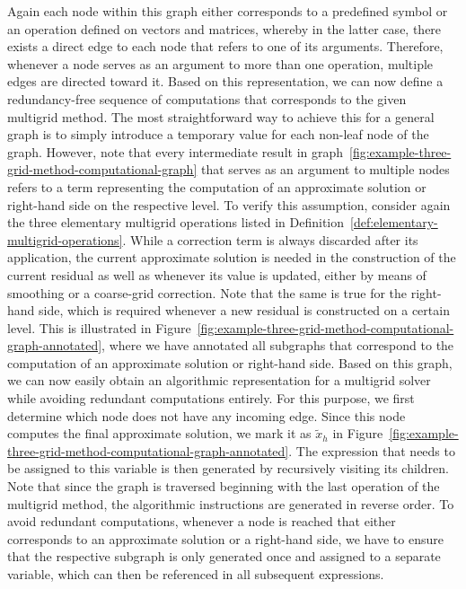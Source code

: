Again each node within this graph either corresponds to a predefined symbol or an operation defined on vectors and matrices, whereby in the latter case, there exists a direct edge to each node that refers to one of its arguments.  
Therefore, whenever a node serves as an argument to more than one operation, multiple edges are directed toward it.
Based on this representation, we can now define a redundancy-free sequence of computations that corresponds to the given multigrid method.
The most straightforward way to achieve this for a general graph is to simply introduce a temporary value for each non-leaf node of the graph.
However, note that every intermediate result in graph~\ref{fig:example-three-grid-method-computational-graph} that serves as an argument to multiple nodes refers to a term representing the computation of an approximate solution or right-hand side on the respective level.
To verify this assumption, consider again the three elementary multigrid operations listed in Definition~\ref{def:elementary-multigrid-operations}.
While a correction term is always discarded after its application, the current approximate solution is needed in the construction of the current residual as well as whenever its value is updated, either by means of smoothing or a coarse-grid correction.
Note that the same is true for the right-hand side, which is required whenever a new residual is constructed on a certain level.
This is illustrated in Figure~\ref{fig:example-three-grid-method-computational-graph-annotated}, where we have annotated all subgraphs that correspond to the computation of an approximate solution or right-hand side.
Based on this graph, we can now easily obtain an algorithmic representation for a multigrid solver while avoiding redundant computations entirely.
For this purpose, we first determine which node does not have any incoming edge.
Since this node computes the final approximate solution, we mark it as $\tilde{x}_h$ in Figure~\ref{fig:example-three-grid-method-computational-graph-annotated}.
The expression that needs to be assigned to this variable is then generated by recursively visiting its children.
Note that since the graph is traversed beginning with the last operation of the multigrid method, the algorithmic instructions are generated in reverse order. 
To avoid redundant computations, whenever a node is reached that either corresponds to an approximate solution or a right-hand side, we have to ensure that the respective subgraph is only generated once and assigned to a separate variable, which can then be referenced in all subsequent expressions.
